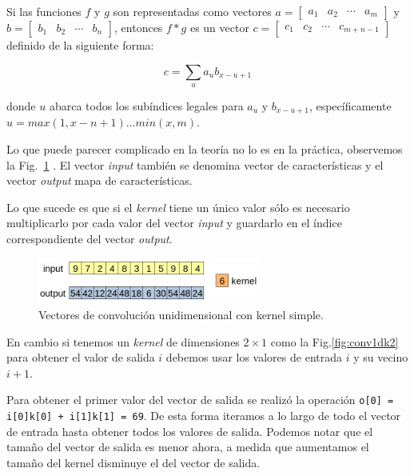 \documentclass[a4paper,12pt]{article}
\begin{document}
Si las funciones $f$ y $g$ son representadas como vectores $a = \begin{bmatrix} a_1 & a_2 & \cdots & a_m \end{bmatrix}$ y $b = \begin{bmatrix} b_1 & b_2 & \cdots & b_n \end{bmatrix}$, entonces $f*g$ es un vector $c = \begin{bmatrix} c_1 & c_2 & \cdots & c_{m+n-1} \end{bmatrix}$ definido de la siguiente forma:

$$ c = \sum_{u} a_u b_{x-u+1}$$

donde $u$ abarca todos los subíndices legales para $a_u$ y $b_{x-u+1}$, específicamente $u=max(1, x-n+1)\dots min(x,m).$

Lo que puede parecer complicado en la teoría no lo es en la práctica, observemos la Fig.~\ref{fig:conv1dk1} \citep{Cogneethi2019Aug}. El vector \textit{input} también se denomina vector de características y el vector \textit{output} mapa de características.

Lo que sucede es que si el \textit{kernel} tiene un único valor sólo es necesario multiplicarlo por cada valor del vector \textit{input} y guardarlo en el índice correspondiente del vector \textit{output}.

\begin{figure}[H]
	\begin{center}				
		\includegraphics[width=0.65\textwidth]{tesis_24.png}
		\caption{Vectores de convolución unidimensional con kernel simple.}
		\label{fig:conv1dk1}
	\end{center}
\end{figure}

En cambio si tenemos un \textit{kernel} de dimensiones $2 \times 1$ como la Fig.\ref{fig:conv1dk2} para obtener el valor de salida $i$ debemos usar los valores de entrada $i$ y su vecino $i+1$.

Para obtener el primer valor del vector de salida se realizó la operación \texttt{o[0] = i[0]k[0] + i[1]k[1] = 69}. De esta forma iteramos a lo largo de todo el vector de entrada hasta obtener todos los valores de salida. Podemos notar que el tamaño del vector de salida es menor ahora, a medida que aumentamos el tamaño del kernel disminuye el del vector de salida.
\end{document}
